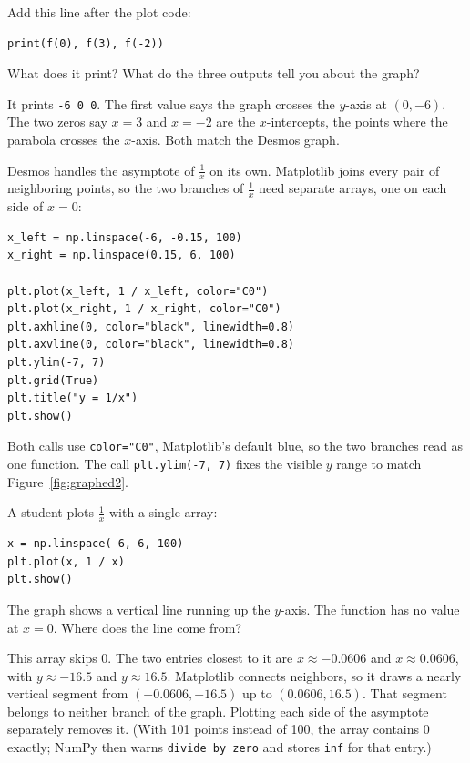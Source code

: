 \begin{Exercise}[title={Reading values from f}, label={ex:functions-python-1}]
  Add this line after the plot code:
  \begin{verbatim}
print(f(0), f(3), f(-2))
  \end{verbatim}
  What does it print? What do the three outputs tell you about the graph?
\end{Exercise}
\begin{Answer}[ref={ex:functions-python-1}]
  It prints \texttt{-6 0 0}. The first value says the graph
  crosses the $y$-axis at $(0, -6)$. The two zeros say $x = 3$ and $x = -2$
  are the $x$-intercepts, the points where the parabola crosses the
  $x$-axis. Both match the Desmos graph.
\end{Answer}

Desmos handles the asymptote of $\frac{1}{x}$ on its own. Matplotlib joins
every pair of neighboring points, so the two branches of $\frac{1}{x}$ need
separate arrays, one on each side of $x = 0$:

\begin{verbatim}
x_left = np.linspace(-6, -0.15, 100)
x_right = np.linspace(0.15, 6, 100)

plt.plot(x_left, 1 / x_left, color="C0")
plt.plot(x_right, 1 / x_right, color="C0")
plt.axhline(0, color="black", linewidth=0.8)
plt.axvline(0, color="black", linewidth=0.8)
plt.ylim(-7, 7)
plt.grid(True)
plt.title("y = 1/x")
plt.show()
\end{verbatim}

Both calls use \texttt{color="C0"}, Matplotlib's default blue,
so the two branches read as one function. The call
\texttt{plt.ylim(-7, 7)} fixes the visible $y$ range to match
Figure~\ref{fig:graphed2}.

\begin{Exercise}[title={The phantom line}, label={ex:functions-python-2}]
  A student plots $\frac{1}{x}$ with a single array:
  \begin{verbatim}
x = np.linspace(-6, 6, 100)
plt.plot(x, 1 / x)
plt.show()
  \end{verbatim}
  The graph shows a vertical line running up the $y$-axis. The function has
  no value at $x = 0$. Where does the line come from?
\end{Exercise}
\begin{Answer}[ref={ex:functions-python-2}]
  This array skips 0. The two entries closest to it are $x \approx -0.0606$
  and $x \approx 0.0606$, with $y \approx -16.5$ and $y \approx 16.5$.
  Matplotlib connects neighbors, so it draws a nearly vertical segment from
  $(-0.0606, -16.5)$ up to $(0.0606, 16.5)$. That segment belongs to neither
  branch of the graph. Plotting each side of the asymptote separately
  removes it. (With 101 points instead of 100, the array contains 0 exactly;
  NumPy then warns \texttt{divide by zero} and stores
  \texttt{inf} for that entry.)
\end{Answer}


